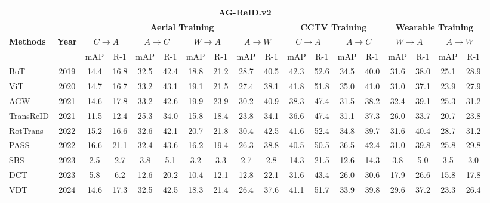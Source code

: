 \documentclass[border=4pt]{standalone}
\begin{document}
\scriptsize
\setlength{\tabcolsep}{3pt}
\begin{tabular}{l c cccccccc cccc cccc}
\toprule
\multicolumn{18}{c}{\textbf{AG-ReID.v2}} \\
\cmidrule(lr){1-18}
& & \multicolumn{8}{c}{\textbf{Aerial Training}} & \multicolumn{4}{c}{\textbf{CCTV Training}} & \multicolumn{4}{c}{\textbf{Wearable Training}} \\
\cmidrule(lr){3-10} \cmidrule(lr){11-14} \cmidrule(lr){15-18}
\textbf{Methods} & \textbf{Year} & \multicolumn{2}{c}{$C \rightarrow A$} & \multicolumn{2}{c}{$A \rightarrow C$} & \multicolumn{2}{c}{$W \rightarrow A$} & \multicolumn{2}{c}{$A \rightarrow W$} & \multicolumn{2}{c}{$C \rightarrow A$} & \multicolumn{2}{c}{$A \rightarrow C$} & \multicolumn{2}{c}{$W \rightarrow A$} & \multicolumn{2}{c}{$A \rightarrow W$} \\
\cmidrule(lr){3-4} \cmidrule(lr){5-6} \cmidrule(lr){7-8} \cmidrule(lr){9-10} \cmidrule(lr){11-12} \cmidrule(lr){13-14} \cmidrule(lr){15-16} \cmidrule(lr){17-18}
& & mAP & R-1 & mAP & R-1 & mAP & R-1 & mAP & R-1 & mAP & R-1 & mAP & R-1 & mAP & R-1 & mAP & R-1 \\
\midrule
BoT & 2019 & 14.4 & 16.8 & 32.5 & 42.4 & 18.8 & 21.2 & 28.7 & 40.5 & 42.3 & 52.6 & 34.5 & 40.0 & 31.6 & 38.0 & 25.1 & 28.9 \\
ViT & 2020 & 14.7 & 16.7 & 33.2 & 43.1 & 19.1 & 21.5 & 27.4 & 38.1 & 41.8 & 51.8 & 35.0 & 41.0 & 31.0 & 37.1 & 23.9 & 27.9 \\
AGW & 2021 & 14.6 & 17.8 & 33.2 & 42.6 & 19.9 & 23.9 & 30.2 & 40.9 & 38.3 & 47.4 & 31.5 & 38.2 & 32.4 & 39.1 & 25.3 & 31.2 \\
TransReID & 2021 & 11.5 & 12.4 & 25.3 & 34.0 & 15.8 & 18.4 & 23.8 & 34.1 & 36.6 & 47.4 & 31.1 & 37.3 & 26.0 & 33.7 & 20.7 & 23.8 \\
RotTrans & 2022 & 15.2 & 16.6 & 32.6 & 42.1 & 20.7 & 21.8 & 30.4 & 42.5 & 41.6 & 52.4 & 34.8 & 39.7 & 31.6 & 40.4 & 28.7 & 31.2 \\
PASS & 2022 & 16.6 & 21.1 & 32.4 & 43.6 & 16.2 & 19.4 & 26.3 & 38.8 & 40.5 & 50.5 & 36.5 & 42.4 & 31.0 & 39.8 & 25.8 & 29.8 \\
SBS & 2023 & 2.5 & 2.7 & 3.8 & 5.1 & 3.2 & 3.3 & 2.7 & 2.8 & 14.3 & 21.5 & 12.6 & 14.3 & 3.8 & 5.0 & 3.5 & 3.0 \\
DCT & 2023 & 5.8 & 6.2 & 12.6 & 20.2 & 10.4 & 12.1 & 12.8 & 22.1 & 31.6 & 43.4 & 26.0 & 30.6 & 17.9 & 26.6 & 15.8 & 17.8 \\
VDT & 2024 & 14.6 & 17.3 & 32.5 & 42.5 & 18.3 & 21.4 & 26.4 & 37.6 & 41.1 & 51.7 & 33.9 & 39.8 & 29.6 & 37.2 & 23.3 & 26.4 \\

\end{tabular}
\end{document}
